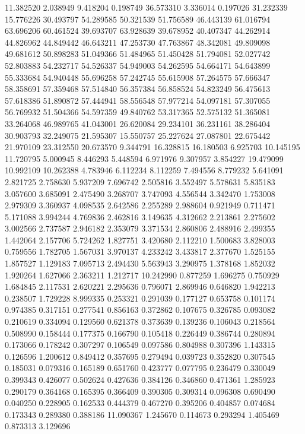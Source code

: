 11.382520
2.038949
9.418204
0.198749
36.573310
3.336014
0.197026
31.232339
15.776226
30.493797
54.289585
50.321539
51.756589
46.443139
61.016794
63.696206
60.461524
39.693707
63.928639
39.678952
40.407347
44.262914
44.826962
44.849442
46.643211
47.253730
47.763867
48.342081
49.809098
49.681612
50.898283
51.049366
51.484965
51.450428
51.794081
52.027742
52.803883
54.232717
54.526337
54.949003
54.262595
54.664171
54.643899
55.333684
54.940448
55.696258
57.242745
55.615908
57.264575
57.666347
58.358691
57.359468
57.514840
56.357384
56.858524
54.823249
56.475613
57.618386
51.890872
57.444941
58.556548
57.977214
54.097181
57.307055
56.769932
51.504366
54.597359
49.840762
53.317365
52.575132
51.365081
33.264068
46.989765
41.043001
26.620084
29.234101
36.231161
38.286404
30.903793
32.249075
21.595307
15.550757
25.227624
27.087801
22.675442
21.970109
23.312550
20.673570
9.344791
16.328815
16.180503
6.925703
10.145195
11.720795
5.000945
8.446293
5.448594
6.971976
9.307957
3.854227
19.479099
10.992109
10.262388
4.783946
6.112234
8.112259
7.494556
8.779232
5.641091
2.821725
2.758630
5.937209
7.696742
2.505816
3.552497
5.578631
5.835183
3.057600
3.685091
2.475490
3.268707
3.747093
4.556544
3.342470
1.753008
2.979309
3.360937
4.098535
2.642586
2.255289
2.988604
0.921949
0.711471
5.171088
3.994244
4.769836
2.462816
3.149635
4.312662
2.213861
2.275602
3.002566
2.737587
2.946182
2.353079
3.371534
2.860806
2.488916
2.499355
1.442064
2.157706
5.724262
1.827751
3.420680
2.112210
1.500683
3.828003
0.759556
1.782705
1.567031
3.970137
4.233242
3.433817
2.377670
1.525155
1.857527
1.129183
7.095713
2.494430
5.563943
3.290975
1.378168
1.852032
1.920264
1.627066
2.363211
1.212717
10.242990
0.877259
1.696275
0.750929
1.684845
2.117531
2.620221
2.295636
0.796071
2.869946
0.646820
1.942213
0.238507
1.729228
8.999335
0.253321
0.291039
0.177127
0.653758
0.101174
0.974385
0.317151
0.277541
0.856163
0.372862
0.107675
0.326785
0.093082
0.210619
0.334094
0.129560
0.621378
0.373639
0.139236
0.106043
0.218564
0.508990
0.158444
0.177375
0.166790
0.105418
0.226449
0.386744
0.280894
0.173066
0.178242
0.307297
0.106549
0.097586
0.804988
0.307396
1.143315
0.126596
1.200612
0.849412
0.357695
0.279494
0.039723
0.352820
0.307545
0.185031
0.079316
0.165189
0.651760
0.423777
0.077795
0.236479
0.330049
0.399343
0.426077
0.502624
0.427636
0.384126
0.346860
0.471361
1.285923
0.290179
0.364168
0.165395
0.366409
0.390305
0.309314
0.096308
0.690490
0.040250
0.228905
0.162533
0.444379
0.467270
0.395206
0.404857
0.074684
0.173343
0.289380
0.388186
11.090367
1.245670
0.114673
0.293294
1.405469
0.873313
3.129696
